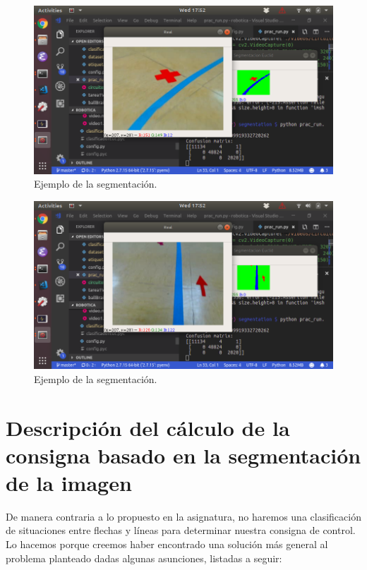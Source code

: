 \documentclass{article}
\begin{document}
	\begin{figure}[H]
	    \centering
	    \includegraphics[width=12cm]{./figures/figura3.png}
	    \caption{Ejemplo de la segmentación.}
	    \label{fig:figura3}
	\end{figure}

	\begin{figure}[H]
	    \centering
	    \includegraphics[width=12cm]{./figures/figura4.png}
	    \caption{Ejemplo de la segmentación.}
	    \label{fig:figura4}
	\end{figure}

\section{Descripción del cálculo de la consigna basado en la segmentación de la imagen}
    De manera contraria a lo propuesto en la asignatura, no haremos una clasificación de situaciones entre flechas y líneas para determinar nuestra consigna de control. Lo hacemos porque creemos haber encontrado una solución más general al problema planteado dadas algunas asunciones, listadas a seguir:
\end{document}
